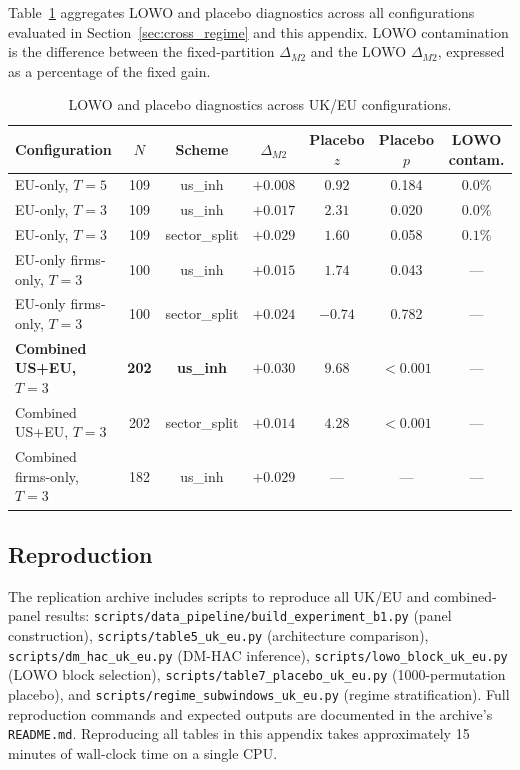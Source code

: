 \documentclass[11pt,a4paper]{article}
\begin{document}
Table~\ref{tab:uk_eu_lowo_placebo} aggregates LOWO and placebo diagnostics across all configurations evaluated in Section~\ref{sec:cross_regime} and this appendix. LOWO contamination is the difference between the fixed-partition $\Delta_{M2}$ and the LOWO $\Delta_{M2}$, expressed as a percentage of the fixed gain.

\begin{table}[H]
\centering
\caption{LOWO and placebo diagnostics across UK/EU configurations.}
\label{tab:uk_eu_lowo_placebo}
\small
\begin{tabular}{lcccccc}
\toprule
Configuration & $N$ & Scheme & $\Delta_{M2}$ & Placebo $z$ & Placebo $p$ & LOWO contam. \\
\midrule
EU-only, $T=5$ & 109 & us\_inh & $+0.008$ & $0.92$ & 0.184 & $0.0\%$ \\
EU-only, $T=3$ & 109 & us\_inh & $+0.017$ & $2.31$ & 0.020 & $0.0\%$ \\
EU-only, $T=3$ & 109 & sector\_split & $+0.029$ & $1.60$ & 0.058 & $0.1\%$ \\
EU-only firms-only, $T=3$ & 100 & us\_inh & $+0.015$ & $1.74$ & 0.043 & --- \\
EU-only firms-only, $T=3$ & 100 & sector\_split & $+0.024$ & $-0.74$ & 0.782 & --- \\
\textbf{Combined US+EU, $T=3$} & \textbf{202} & \textbf{us\_inh} & $\mathbf{+0.030}$ & $\mathbf{9.68}$ & $\mathbf{<0.001}$ & --- \\
Combined US+EU, $T=3$ & 202 & sector\_split & $+0.014$ & $4.28$ & $<0.001$ & --- \\
Combined firms-only, $T=3$ & 182 & us\_inh & $+0.029$ & --- & --- & --- \\
\bottomrule
\end{tabular}
\end{table}

\subsection{Reproduction}

The replication archive includes scripts to reproduce all UK/EU and combined-panel results: \texttt{scripts/data\_pipeline/build\_experiment\_b1.py} (panel construction), \texttt{scripts/table5\_uk\_eu.py} (architecture comparison), \texttt{scripts/dm\_hac\_uk\_eu.py} (DM-HAC inference), \texttt{scripts/lowo\_block\_uk\_eu.py} (LOWO block selection), \texttt{scripts/table7\_placebo\_uk\_eu.py} (1000-permutation placebo), and \texttt{scripts/regime\_subwindows\_uk\_eu.py} (regime stratification). Full reproduction commands and expected outputs are documented in the archive's \texttt{README.md}. Reproducing all tables in this appendix takes approximately 15 minutes of wall-clock time on a single CPU.
\end{document}
